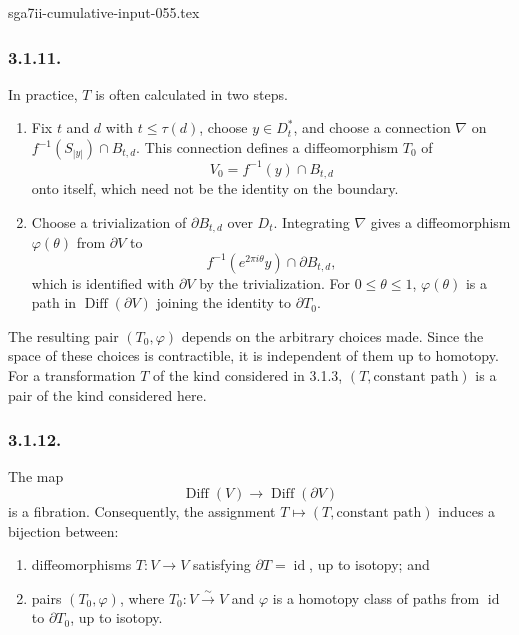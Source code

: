 \begin{filecontents*}{sga7ii-cumulative-input-055.tex}
\subsubsection*{3.1.11.}
In practice, $T$ is often calculated in two steps.

\begin{enumerate}[label=(\alph*)]
\item Fix $t$ and $d$ with $t\leq\tau(d)$, choose
  $y\in D_t^*$, and choose a connection $\nabla$ on
  $f^{-1}(S_{|y|})\cap B_{t,d}$.  This connection defines a
  diffeomorphism $T_0$ of
  \[
  V_0=f^{-1}(y)\cap B_{t,d}
  \]
  onto itself, which need not be the identity on the boundary.
\item Choose a trivialization of $\partial B_{t,d}$ over $D_t$.
  Integrating $\nabla$ gives a diffeomorphism $\varphi(\theta)$ from
  $\partial V$ to
  \[
  f^{-1}(e^{2\pi i\theta}y)\cap\partial B_{t,d},
  \]
  which is identified with $\partial V$ by the trivialization.  For
  $0\leq\theta\leq1$, $\varphi(\theta)$ is a path in
  $\operatorname{Diff}(\partial V)$ joining the identity to
  $\partial T_0$.
\end{enumerate}

The resulting pair $(T_0,\varphi)$ depends on the arbitrary choices
made.  Since the space of these choices is contractible, it is
independent of them up to homotopy.  For a transformation $T$ of the
kind considered in 3.1.3, $(T,\text{constant path})$ is a pair of the
kind considered here.

\subsubsection*{3.1.12.}
The map
\[
\operatorname{Diff}(V)\longrightarrow\operatorname{Diff}(\partial V)
\]
is a fibration.  Consequently, the assignment
$T\mapsto(T,\text{constant path})$ induces a bijection between:

\begin{enumerate}[label=\alph*)]
\item diffeomorphisms $T:V\to V$ satisfying
  $\partial T=\operatorname{id}$, up to isotopy; and
\item pairs $(T_0,\varphi)$, where $T_0:V\xrightarrow{\sim}V$ and
  $\varphi$ is a homotopy class of paths from
  $\operatorname{id}$ to $\partial T_0$, up to isotopy.
\end{enumerate}


\end{filecontents*}
